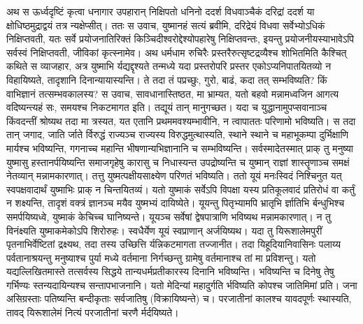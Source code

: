 \adhyAya
{}
\vakya अथ स ऊर्ध्वदृष्टिं कृत्वा धनागार उपहारान् निक्षिपतो धनिनो ददर्श
\vakya विधवाञ्चैकं दरिद्रां ददर्श या क्षोधिष्ठमुद्राद्वयं तत्र न्यक्षेप्सीत्।
\vakya ततः स उवाच, युष्मानहं सत्यं ब्रवीमि, दरिद्रेयं विधवा सर्वेभ्योऽधिकं निक्षिप्तवती, यतः सर्वे प्रयोजनातिरिक्तं किञ्चिदीश्वरोद्देश्योपहारेषु निक्षिप्तवन्तः,
\vakya इयन्तु प्रयोजनीयस्याभावेऽपि सर्वस्वं निक्षिप्तवती, जीविकां कृत्स्नामेव।
\vakya अथ धर्मधाम रुचिरैः प्रस्तरैरुत्सृष्टद्रव्यैश्च शोभितमिति कैश्चित् कथिते स व्याजहार,
\vakya अत्र युष्माभि र्यद्यद्दृश्यते तन्मध्ये यदा प्रस्तरोपरि प्रस्तर एकोऽप्यनिपातयितव्यो न विहायिष्यते, तादृशानि दिनान्यायास्यन्ति।
\vakya ते तदा तं पप्रच्छुः, गुरो, बाढं, कदा तत् सम्भविष्यति? किं वाभिज्ञानं तत्सम्भवकालस्य?
\vakya स उवाच, सावधानास्तिष्ठत, मा भ्राम्यत, यतो बहवो मन्नामध्वजिन आगत्य वदिष्यन्त्यहं सः, समयश्च निकटमागत इति। तद्यूयं तान् मानुगच्छत।
\vakya यदा च युद्धानामुपप्सवानाञ्च किंवदन्तीं श्रोष्यथ तदा मा त्रस्यत, यत एतानि प्रथममवश्यम्भावीनि, न त्वापाततः परिणामो भविष्यति।
\vakya स तदा तान् जगाद, जाति र्जाते र्विरुद्धं राज्यञ्च राज्यस्य विरुद्धमुत्थास्यति, स्थाने स्थाने च महाभूकम्पा दुर्भिक्षाणि मार्यश्च भविष्यन्ति, गगनाच्च महान्ति भीषणान्यभिज्ञानानि च सम्भविष्यन्ति।
\vakya सर्वस्मादेतस्मात् प्राक् तु मनुष्या युष्मासु हस्तानर्पयिष्यन्ति समाजगृहेषु कारासु च निधास्यन्त उपद्रोष्यन्ति च युष्मान् राज्ञां शास्तॄणाञ्च समक्षं नेतव्यान् मन्नामकारणात्।
\vakya तत्तु युष्मत्पक्षीयसाक्ष्येण परिणतं भविष्यति।
\vakya ततो यूयं मनःस्विदं निश्चिनुत यत् स्वपक्षवादार्थं युष्माभिः प्राक् न चिन्तयितव्यं।
\vakya यतो युष्माकं सर्वेऽपि विपक्षा यस्य प्रतिकूलवादं प्रतिरोधं वा कर्तुं न शक्ष्यन्ति, तादृशं वक्त्रं ज्ञानञ्च मयैव युष्मभ्यं दायिष्येते।
\vakya यूयन्तु पितृभ्यामपि भ्रातृभि र्ज्ञातिभि र्बन्धुभिश्च समर्पयिष्यध्वे, युष्माकं केचिच्च घानिष्यन्ते।
\vakya यूयञ्च सर्वेषां द्वेषपात्राणि भविष्यथ मन्नामकारणात्।
\vakya न तु विनंक्ष्यति युष्माकमेकोऽपि शिरोरुहः।
\vakya स्वधैर्येण यूयं स्वप्राणान् अर्जयिष्यथ।
\vakya यदा तु यिरूशालेमपुरीं पृतनाभिर्वेष्टितां द्रक्ष्यथ, तदा तस्य उच्छित्ति र्यन्निकटमागता तज्जानीत।
\vakya तदा यिहूदियानिवासिनः पलाय्य पर्वतानाश्रयन्तु मनुष्याश्च पुर्या मध्ये वर्तमाना निर्गच्छन्तु ग्रामेषु वर्तमानाश्च तां मा प्रविशन्तु।
\vakya यतो यद्यल्लिखितमास्ते तत्सर्वस्य सिद्धये तान्यधर्मप्रतीकारस्य दिनानि भविष्यन्ति।
\vakya भविष्यन्ति च दिनेषु तेषु गर्भिण्यः स्तन्यदायिन्यश्च सन्तापभाजनानि। यतो मेदिन्यां महादुर्गति र्भविष्यति कोपश्च जातिमिमां प्रति।
\vakya जना असिग्रस्ताः पतिष्यन्ति बन्दीकृताः सर्वजातिषु (विक्रायिष्यन्ते) च। परजातीनां कालश्च यावदपूर्णः स्थास्यति, तावद् यिरूशालेमं नित्यं परजातीनां चरणै र्मर्दयिष्यते।
